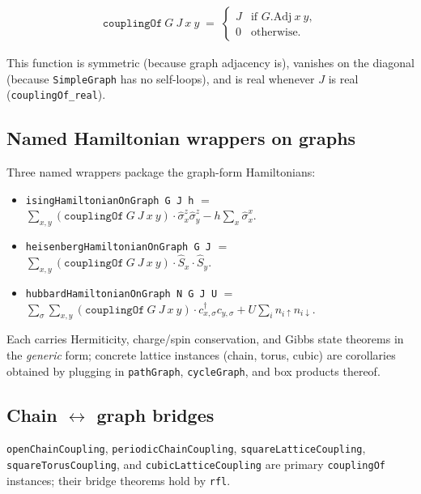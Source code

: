 \documentclass[a4paper,11pt]{article}
\begin{document}
\begin{align*}
  \texttt{couplingOf}~G~J~x~y \;=\; \begin{cases}
    J & \text{if } G.\mathrm{Adj}~x~y, \\
    0 & \text{otherwise.}
  \end{cases}
\end{align*}

This function is symmetric (because graph adjacency is),
vanishes on the diagonal (because \texttt{SimpleGraph} has no
self-loops), and is real whenever $J$ is real
(\texttt{couplingOf\_real}).

\subsection{Named Hamiltonian wrappers on graphs}

Three named wrappers package the graph-form Hamiltonians:

\begin{itemize}
  \item \texttt{isingHamiltonianOnGraph G J h} $=$
    $\sum_{x,y} (\texttt{couplingOf}~G~J~x~y) \cdot \hat{\sigma}^z_x \hat{\sigma}^z_y
     - h \sum_x \hat{\sigma}^x_x$.
  \item \texttt{heisenbergHamiltonianOnGraph G J} $=$
    $\sum_{x,y} (\texttt{couplingOf}~G~J~x~y) \cdot \hat{S}_x \cdot \hat{S}_y$.
  \item \texttt{hubbardHamiltonianOnGraph N G J U} $=$
    $\sum_\sigma \sum_{x,y} (\texttt{couplingOf}~G~J~x~y) \cdot c_{x,\sigma}^\dagger c_{y,\sigma}
     + U \sum_i n_{i\uparrow} n_{i\downarrow}$.
\end{itemize}

Each carries Hermiticity, charge/spin conservation, and Gibbs
state theorems in the \emph{generic} form; concrete lattice
instances (chain, torus, cubic) are corollaries obtained by
plugging in \texttt{pathGraph}, \texttt{cycleGraph}, and
box products thereof.

\subsection{Chain $\leftrightarrow$ graph bridges}

\texttt{openChainCoupling}, \texttt{periodicChainCoupling},
\texttt{squareLatticeCoupling}, \texttt{squareTorusCoupling}, and
\texttt{cubicLatticeCoupling} are primary \texttt{couplingOf}
instances; their bridge theorems hold by \texttt{rfl}.
\end{document}
